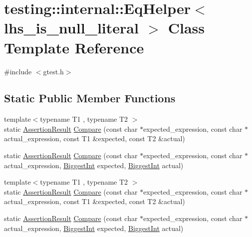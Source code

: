 \hypertarget{classtesting_1_1internal_1_1_eq_helper}{\section{testing\-:\-:internal\-:\-:Eq\-Helper$<$ lhs\-\_\-is\-\_\-null\-\_\-literal $>$ Class Template Reference}
\label{classtesting_1_1internal_1_1_eq_helper}
}


{\ttfamily \#include $<$gtest.\-h$>$}

\subsection*{Static Public Member Functions}
\begin{DoxyCompactItemize}
\item 
{\footnotesize template$<$typename T1 , typename T2 $>$ }\\static \hyperlink{classtesting_1_1_assertion_result}{Assertion\-Result} \hyperlink{classtesting_1_1internal_1_1_eq_helper_ac2977ed90cd3c88607f804e43b86b92c}{Compare} (const char $\ast$expected\-\_\-expression, const char $\ast$actual\-\_\-expression, const T1 \&expected, const T2 \&actual)
\item 
static \hyperlink{classtesting_1_1_assertion_result}{Assertion\-Result} \hyperlink{classtesting_1_1internal_1_1_eq_helper_a3de996954b41d484c065ed824fe7eac9}{Compare} (const char $\ast$expected\-\_\-expression, const char $\ast$actual\-\_\-expression, \hyperlink{namespacetesting_1_1internal_a05c6bd9ede5ccdf25191a590d610dcc6}{Biggest\-Int} expected, \hyperlink{namespacetesting_1_1internal_a05c6bd9ede5ccdf25191a590d610dcc6}{Biggest\-Int} actual)
\item 
{\footnotesize template$<$typename T1 , typename T2 $>$ }\\static \hyperlink{classtesting_1_1_assertion_result}{Assertion\-Result} \hyperlink{classtesting_1_1internal_1_1_eq_helper_ac2977ed90cd3c88607f804e43b86b92c}{Compare} (const char $\ast$expected\-\_\-expression, const char $\ast$actual\-\_\-expression, const T1 \&expected, const T2 \&actual)
\item 
static \hyperlink{classtesting_1_1_assertion_result}{Assertion\-Result} \hyperlink{classtesting_1_1internal_1_1_eq_helper_a3de996954b41d484c065ed824fe7eac9}{Compare} (const char $\ast$expected\-\_\-expression, const char $\ast$actual\-\_\-expression, \hyperlink{namespacetesting_1_1internal_a05c6bd9ede5ccdf25191a590d610dcc6}{Biggest\-Int} expected, \hyperlink{namespacetesting_1_1internal_a05c6bd9ede5ccdf25191a590d610dcc6}{Biggest\-Int} actual)
\end{DoxyCompactItemize}


